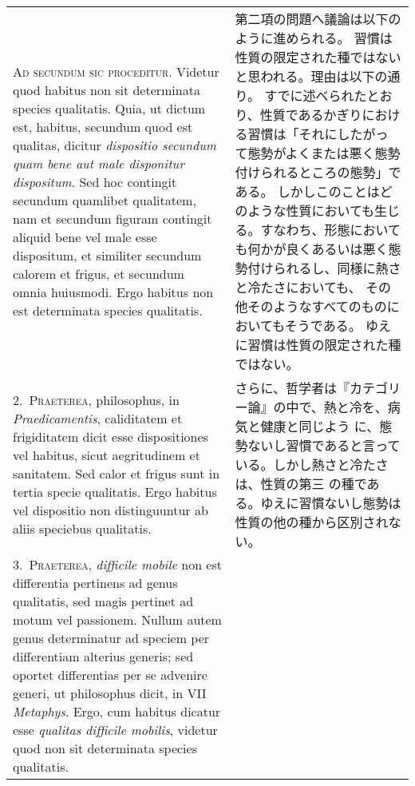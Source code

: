 \documentclass[10pt]{jsarticle} %
\begin{document}
\begin{longtable}{p{21em}p{21em}}

{\scshape Ad secundum sic proceditur}. Videtur quod habitus non sit determinata
species qualitatis. Quia, ut dictum est, habitus, secundum quod est
qualitas, dicitur {\itshape dispositio secundum quam bene aut male disponitur
dispositum}. Sed hoc contingit secundum quamlibet qualitatem, nam et
secundum figuram contingit aliquid bene vel male esse dispositum, et
similiter secundum calorem et frigus, et secundum omnia
huiusmodi. Ergo habitus non est determinata species qualitatis.

&

第二項の問題へ議論は以下のように進められる。
習慣は性質の限定された種ではないと思われる。理由は以下の通り。
すでに述べられたとおり、性質であるかぎりにおける習慣は「それにしたがっ
て態勢がよくまたは悪く態勢付けられるところの態勢」である。
しかしこのことはどのような性質においても生じる。すなわち、形態において
も何かが良くあるいは悪く態勢付けられるし、同様に熱さと冷たさにおいても、
その他そのようなすべてのものにおいてもそうである。
ゆえに習慣は性質の限定された種ではない。



\\



2.~{\scshape Praeterea}, philosophus, in {\itshape Praedicamentis}, caliditatem et frigiditatem
dicit esse dispositiones vel habitus, sicut aegritudinem et
sanitatem. Sed calor et frigus sunt in tertia specie qualitatis. Ergo
habitus vel dispositio non distinguuntur ab aliis speciebus
qualitatis.

&

さらに、哲学者は『カテゴリー論』の中で、熱と冷を、病気と健康と同じよう
に、態勢ないし習慣であると言っている。しかし熱さと冷たさは、性質の第三
の種である。ゆえに習慣ないし態勢は性質の他の種から区別されない。

\\



3.~{\scshape Praeterea}, {\itshape difficile mobile} non est differentia pertinens ad genus
qualitatis, sed magis pertinet ad motum vel passionem. Nullum autem
genus determinatur ad speciem per differentiam alterius generis; sed
oportet differentias per se advenire generi, ut philosophus dicit, in
VII {\itshape Metaphys}. Ergo, cum habitus dicatur esse {\itshape qualitas difficile
mobilis}, videtur quod non sit determinata species qualitatis.


\end{longtable}
\end{document}
